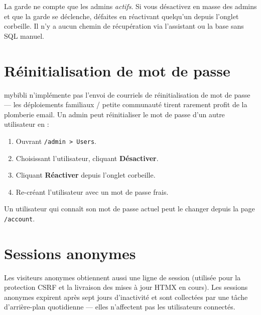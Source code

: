 \begin{warning}
La garde ne compte que les admins \emph{actifs}. Si vous
désactivez en masse des admins et que la garde se déclenche,
défaites en réactivant quelqu'un depuis l'onglet corbeille. Il n'y
a aucun chemin de récupération via l'assistant ou la base sans
SQL manuel.
\end{warning}

\section{Réinitialisation de mot de passe}

mybibli n'implémente pas l'envoi de courriels de réinitialisation
de mot de passe — les déploiements familiaux / petite communauté
tirent rarement profit de la plomberie email. Un admin peut
réinitialiser le mot de passe d'un autre utilisateur en :

\begin{enumerate}
  \item Ouvrant \texttt{/admin > Users}.
  \item Choisissant l'utilisateur, cliquant \textbf{Désactiver}.
  \item Cliquant \textbf{Réactiver} depuis l'onglet corbeille.
  \item Re-créant l'utilisateur avec un mot de passe frais.
\end{enumerate}

Un utilisateur qui connaît son mot de passe actuel peut le changer
depuis la page \texttt{/account}.

\section{Sessions anonymes}

Les visiteurs anonymes obtiennent aussi une ligne de session
(utilisée pour la protection CSRF et la livraison des mises à jour
HTMX en cours). Les sessions anonymes expirent après sept jours
d'inactivité et sont collectées par une tâche d'arrière-plan
quotidienne — elles n'affectent pas les utilisateurs connectés.
